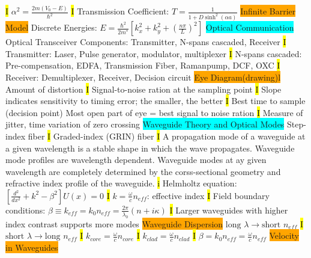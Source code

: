 \documentclass[fontsize=3]{scrartcl}
\begin{document}
\hl{I}
$\alpha^2 = \frac{2m (V_0 - E)}{\hbar^2}$
\hl{I}
Transmission Coefficient: $T = \frac{1}{1+ D\sinh^2 (\alpha a)}$
\colorbox{Orange}{Infinite Barrier Model}
Discrete Energies: $E = \frac{\hbar^2}{2m^*}[k_x^2 + k_y^2 + (\frac{n\pi}{L})^2]$
\colorbox{Cyan}{Optical Communication}
Optical Transceiver Components: Transmitter, N-spans cascaded, Receiver
\hl{I}
Transmitter: Laser, Pulse generator, modulator, multiplexer
\hl{I}
N-spans cascaded: Pre-compensation, EDFA, Transmission Fiber, Ramanpump, DCF, OXC
\hl{I}
Receiver: Demultiplexer, Receiver, Decision circuit  
\colorbox{Orange}{Eye Diagram(drawing)l}
Amount of distortion
\hl{I}
Signal-to-noise ration at the sampling point
\hl{I}
Slope indicates sensitivity to timing error; the smaller, the better
\hl{I}
Best time to sample (decision point) Most open part of eye = best signal to noise ration
\hl{I}
Measure of jitter, time variation of zero crossing
\colorbox{Cyan}{Waveguide Theory and Optical Modes}
Step-index fiber
\hl{I}
Graded-index (GRIN) fiber
\hl{I}
A propagation mode of a waveguide at a given wavelength is a stable shape in which the wave propagates.
Waveguide mode profiles are wavelength dependent. 
Waveguide modes at ay given wavelength are completely determined by the corss-sectional geometry and refractive index profile of the waveguide.
\hl{i} 
Helmholtz equation: $[\frac{d^2}{dx^2} + k^2 - \beta^2]U(x) = 0$
\hl{I}
$k = \frac{\omega}{c}n_{eff}$: effective index
\hl{I}
Field boundary conditions: $\beta \equiv k_{eff} = k_0 n_{eff} = \frac{2\pi}{\lambda_0}(n+i\kappa)$
\hl{I}
Larger waveguides with higher index contrast supports more modes
\colorbox{Orange}{Waveguide Dispersion}
$\text{long }\lambda \rightarrow \text{short } n_{eff}$ 
\hl{I}
$\text{short }\lambda \rightarrow \text{long } n_{eff}$ 
\hl{I}
$k_{core}=\frac{\omega}{c}n_{core}$
\hl{I}
$k_{clad}=\frac{\omega}{c}n_{clad}$
\hl{I}
$\beta = k_0 n_{eff} = \frac{\omega}{c}n_{eff}$
\colorbox{Orange}{Velocity in Waveguides}
\end{document}
